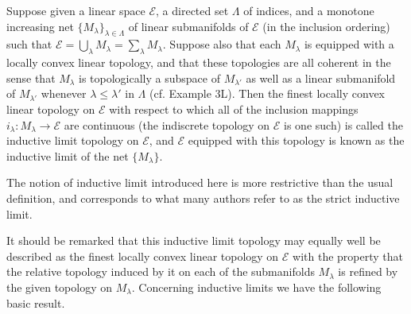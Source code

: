 Suppose given a linear space $\mathcal{E}$, a directed set $\Lambda$ of indices, and a monotone increasing net $\{M_\lambda\}_{\lambda \in \Lambda}$ of linear submanifolds of $\mathcal{E}$ (in the inclusion ordering) such that $\mathcal{E} = \bigcup_\lambda M_\lambda = \sum_\lambda M_\lambda$. Suppose also that each $M_\lambda$ is equipped with a locally convex linear topology, and that these topologies are all coherent in the sense that $M_\lambda$ is topologically a subspace of $M_{\lambda'}$ as well as a linear submanifold of $M_{\lambda'}$ whenever $\lambda \leq \lambda'$ in $\Lambda$ (cf. Example 3L). Then the finest locally convex linear topology on $\mathcal{E}$ with respect to which all of the inclusion mappings $i_\lambda : M_\lambda \rightarrow \mathcal{E}$ are continuous (the indiscrete topology on $\mathcal{E}$ is one such) is called the inductive limit topology on $\mathcal{E}$, and $\mathcal{E}$ equipped with this topology is known as the inductive limit of the net $\{M_\lambda\}$.

The notion of inductive limit introduced here is more restrictive than the usual definition, and corresponds to what many authors refer to as the strict inductive limit.

It should be remarked that this inductive limit topology may equally well be described as the finest locally convex linear topology on $\mathcal{E}$ with the property that the relative topology induced by it on each of the submanifolds $M_\lambda$ is refined by the given topology on $M_\lambda$. Concerning inductive limits we have the following basic result.
